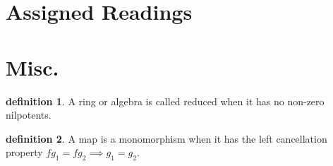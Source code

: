 \documentclass[10.5pt]{article}
\theoremstyle{definition}
\newtheorem{definition}{definition}
\begin{document}
    \section{Assigned Readings}

    \section{Misc.}
    \begin{definition}
        A ring or algebra is called reduced when it has no non-zero nilpotents.
    \end{definition}
    \begin{definition}
        A map is a monomorphism when it has the left cancellation property \(fg_1 = fg_2 \implies g_1 = g_2\).
    \end{definition}
\end{document}

